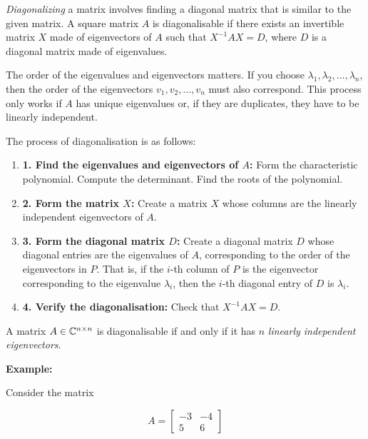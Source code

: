 \emph{Diagonalizing} a matrix involves finding a diagonal matrix that is similar to the given matrix. 
A square matrix \(A\) is diagonalisable if there exists an invertible matrix \(X\) made of eigenvectors of 
\(A\) such that \(X^{-1}AX = D\), where \(D\) is a diagonal matrix made of eigenvalues.

The order of the eigenvalues and eigenvectors matters. If you choose 
\(\lambda_1, \lambda_2, \dots, \lambda_n\), then the order of the eigenvectors 
\(v_1, v_2, \dots, v_n\) must also correspond. This process only works if \(A\) 
has unique eigenvalues or, if they are duplicates, they have to be linearly independent.

The process of diagonalisation is as follows:

\begin{enumerate}
    
    \item \textbf{1. Find the eigenvalues and eigenvectors of \(A\):} 
        \subitem Form the characteristic polynomial. 
        \subitem Compute the determinant. 
        \subitem Find the roots of the polynomial.
   
    \item \textbf{2. Form the matrix \(X\):} Create a matrix \(X\) whose columns are the linearly independent eigenvectors of \(A\).

    \item \textbf{3. Form the diagonal matrix \(D\):} Create a diagonal matrix \(D\) whose diagonal entries are the eigenvalues of \(A\), corresponding to 
    the order of the eigenvectors in \(P\). That is, if the \(i\)-th column of \(P\) is the eigenvector 
    corresponding to the eigenvalue \(\lambda_i\), then the \(i\)-th diagonal entry of \(D\) is \(\lambda_i\).

    \item \textbf{4. Verify the diagonalisation:} Check that \(X^{-1}AX = D\).
    
\end{enumerate} 

A matrix \(A \in \mathbb{C}^{n \times n}\) is diagonalisable if and only if it has \(n\) \emph{linearly independent eigenvectors}.

\textbf{Example: }

Consider the matrix

\[
    A = \begin{bmatrix}
    -3 & -4 \\
    5 & 6
    \end{bmatrix}
\]

